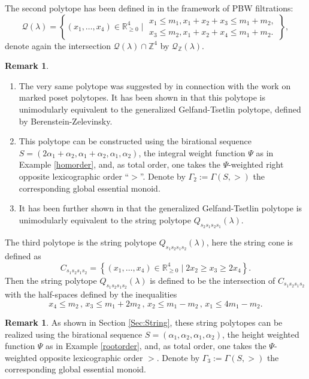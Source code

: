 \documentclass{emsprocart}
\theoremstyle{definition}
\newtheorem{remark}[theorem]{Remark}
\begin{document}
The second polytope has been defined in \cite{FFL3} in the framework of PBW filtrations:
\[
\mathcal{Q}(\lambda) = \left\{ (x_1,\ldots,x_4) \in \mathbb{R}_{\geq 0}^4 \mid \begin{array}{c} x_1\leq m_1, x_1+x_2+x_3 \leq m_1 + m_2, 
\\  x_3\leq m_2, x_1+x_2+x_4\leq m_1+m_2.\end{array}\right\},
\]
denote again the intersection $\mathcal{Q}(\lambda) \cap \mathbb{Z}^4$ by $\mathcal{Q}_{\mathbb{Z}}(\lambda)$.
\begin{remark}\label{stringetal}
\begin{enumerate}
\item The very same polytope was suggested by \cite{ABS} in connection with the work on marked poset polytopes. 
It has been shown in \cite{Fo1} 
that this polytope is unimodularly equivalent to the generalized Gelfand-Tsetlin polytope, defined by Berenstein-Zelevinsky.
\item This polytope can be constructed using the birational sequence $S=(2\alpha_1+\alpha_2, \alpha_1+\alpha_2,\alpha_1,\alpha_2)$,
the integral weight function $\Psi$ as in Example \ref{homorder}, and, as total order, one takes the $\Psi$-weighted right opposite lexicographic order ``$>$''. Denote by $\Gamma_2:=\Gamma(S,>)$ the corresponding global essential monoid.
\item It has been further shown in \cite{L3} that the generalized Gelfand-Tsetlin polytope is unimodularly equivalent to the string polytope $Q_{s_2s_1s_2s_1}(\lambda)$.
\end{enumerate}
\end{remark}
The third polytope is the string polytope $Q_{s_1s_2s_1s_2}(\lambda)$, here the string cone is defined as
\[
C_{s_1s_2s_1s_2} = \left\{ (x_1,\ldots,x_4) \in \mathbb{R}^4_{\geq 0} \mid 2x_2 \geq x_3 \geq 2x_4 \right\}.
\]
Then the string polytope $Q_{s_1s_2s_1s_2}(\lambda)$ is defined to be the intersection of $C_{s_1s_2s_1s_2}$ with the half-spaces defined by the inequalities
\[
x_4 \leq m_2 \, , \, x_3 \leq m_1 + 2m_2 \, , \, x_2 \leq m_1  - m_2 \, , \, x_1 \leq 4m_1 - m_2.
\]

\begin{remark}\label{remark:sp4.3}
As shown in Section \ref{Sec:String}, these string polytopes can be realized using the birational sequence 
$S=(\alpha_1,\alpha_2,\alpha_1,\alpha_2)$, the height weighted function $\Psi$ as in Example \ref{rootorder}, and,
as total order, one takes the $\Psi$-weighted opposite lexicographic order $>$. 
Denote by $\Gamma_3:=\Gamma(S,>)$ the corresponding global essential monoid.

\end{remark}
\end{document}
